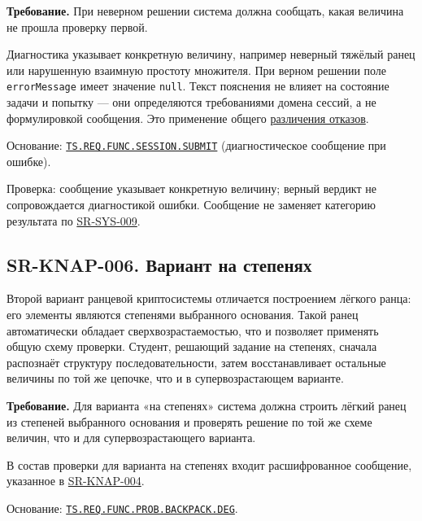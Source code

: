 \documentclass[12pt,a4paper]{article}
\begin{document}
\textbf{Требование.} При неверном решении система должна сообщать, какая величина не прошла проверку первой.

Диагностика указывает конкретную величину, например неверный тяжёлый ранец или нарушенную взаимную простоту множителя. При верном решении поле \texttt{errorMessage} имеет значение \texttt{null}. Текст пояснения не влияет на состояние задачи и попытку --- они определяются требованиями домена сессий, а не формулировкой сообщения. Это применение общего {\hyperlink{sr-sys-009-различение-отказов}{различения отказов}}.

Основание: {\href{../02\_Техническое\_задание/DOC-02\_Техническое\_задание.pdf\#ts-req-func-session-submit}{\texttt{TS.\allowbreak{}REQ.\allowbreak{}FUNC.\allowbreak{}SESSION.\allowbreak{}SUBMIT}}} (диагностическое сообщение при ошибке).

Проверка: сообщение указывает конкретную величину; верный вердикт не сопровождается диагностикой ошибки. Сообщение не заменяет категорию результата по {\hyperlink{sr-sys-009}{SR-SYS-009}}.

\subsection{SR-KNAP-006. Вариант на степенях}\label{sr-knap-006-ux432ux430ux440ux438ux430ux43dux442-ux43dux430-ux441ux442ux435ux43fux435ux43dux44fux445}

\hypertarget{sr-knap-006-вариант-на-степенях}{}

\hypertarget{sr-knap-006}{}

Второй вариант ранцевой криптосистемы отличается построением лёгкого ранца: его элементы являются степенями выбранного основания. Такой ранец автоматически обладает сверхвозрастаемостью, что и позволяет применять общую схему проверки. Студент, решающий задание на степенях, сначала распознаёт структуру последовательности, затем восстанавливает остальные величины по той же цепочке, что и в супервозрастающем варианте.

\textbf{Требование.} Для варианта «на степенях» система должна строить лёгкий ранец из степеней выбранного основания и проверять решение по той же схеме величин, что и для супервозрастающего варианта.

В состав проверки для варианта на степенях входит расшифрованное сообщение, указанное в {\hyperlink{sr-knap-004}{SR-KNAP-004}}.

Основание: {\href{../02\_Техническое\_задание/DOC-02\_Техническое\_задание.pdf\#ts-req-func-prob-backpack-deg}{\texttt{TS.\allowbreak{}REQ.\allowbreak{}FUNC.\allowbreak{}PROB.\allowbreak{}BACKPACK.\allowbreak{}DEG}}}.
\end{document}
